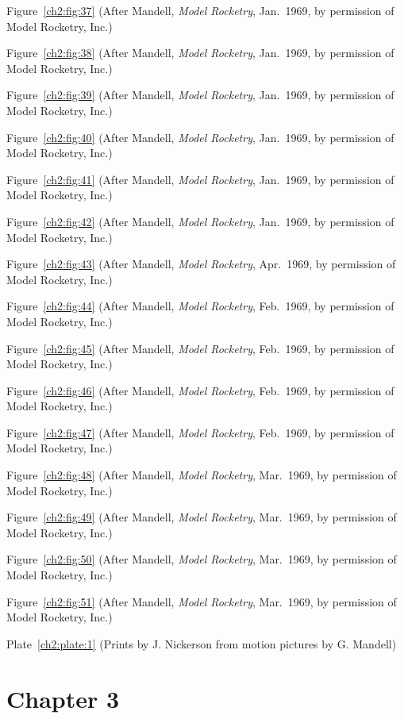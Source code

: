 Figure~\ref{ch2:fig:37} (After Mandell, \emph{Model Rocketry}, Jan.~1969, by permission
of Model Rocketry, Inc.)

Figure~\ref{ch2:fig:38} (After Mandell, \emph{Model Rocketry}, Jan.~1969, by permission
of Model Rocketry, Inc.)

Figure~\ref{ch2:fig:39} (After Mandell, \emph{Model Rocketry}, Jan.~1969, by permission
of Model Rocketry, Inc.)

Figure~\ref{ch2:fig:40} (After Mandell, \emph{Model Rocketry}, Jan.~1969, by permission
of Model Rocketry, Inc.)

Figure~\ref{ch2:fig:41} (After Mandell, \emph{Model Rocketry}, Jan.~1969, by permission
of Model Rocketry, Inc.)

Figure~\ref{ch2:fig:42} (After Mandell, \emph{Model Rocketry}, Jan.~1969, by permission
of Model Rocketry, Inc.)

Figure~\ref{ch2:fig:43} (After Mandell, \emph{Model Rocketry}, Apr.~1969, by permission
of Model Rocketry, Inc.)

Figure~\ref{ch2:fig:44} (After Mandell, \emph{Model Rocketry}, Feb.~1969, by permission
of Model Rocketry, Inc.)

Figure~\ref{ch2:fig:45} (After Mandell, \emph{Model Rocketry}, Feb.~1969, by permission
of Model Rocketry, Inc.)

Figure~\ref{ch2:fig:46} (After Mandell, \emph{Model Rocketry}, Feb.~1969, by permission
of Model Rocketry, Inc.)

Figure~\ref{ch2:fig:47} (After Mandell, \emph{Model Rocketry}, Feb.~1969, by permission
of Model Rocketry, Inc.)

Figure~\ref{ch2:fig:48} (After Mandell, \emph{Model Rocketry}, Mar.~1969, by permission
of Model Rocketry, Inc.)

Figure~\ref{ch2:fig:49} (After Mandell, \emph{Model Rocketry}, Mar.~1969, by permission
of Model Rocketry, Inc.)

Figure~\ref{ch2:fig:50} (After Mandell, \emph{Model Rocketry}, Mar.~1969, by permission
of Model Rocketry, Inc.)

Figure~\ref{ch2:fig:51} (After Mandell, \emph{Model Rocketry}, Mar.~1969, by permission
of Model Rocketry, Inc.)

Plate~\ref{ch2:plate:1} (Prints by J. Nickerson from motion pictures by G. Mandell)

\section*{Chapter 3}\label{credits:ch3}

